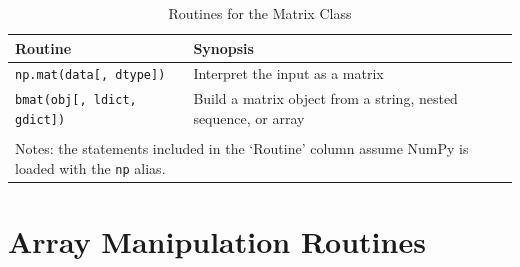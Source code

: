 \documentclass[a4paper,11pt]{book}
\begin{document}
\begin{table}
	\centering
	\caption{Routines for the Matrix Class}
	\label{tab:array_for_matrix_class}
	\begin{tabular}{lp{12cm}}
		\toprule \toprule
			Routine & Synopsis \\
			\midrule
			\texttt{np.mat(data[, dtype])}
			& Interpret the input as a matrix\\
			\texttt{bmat(obj[, ldict, gdict])}
			& Build a matrix object from a string, nested sequence, or array\\
			\bottomrule \\[-1.8ex]
			\multicolumn{2}{l}{Notes: the statements included in the `Routine' column assume NumPy is loaded with the \texttt{np} alias.} \\
	\end{tabular}
\end{table}
\clearpage

\section{Array Manipulation Routines}
\end{document}
